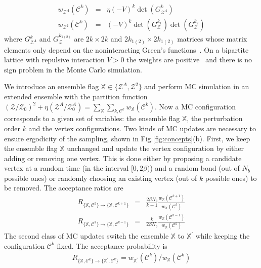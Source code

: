 \documentclass[12pt,onecolumn,english,prl,showpacs,nofootinbib]{revtex4-1}
\begin{document}
\begin{eqnarray}
w_{\mathcal{Z}^{A}}(\mathcal{C}^{k}) &=& \eta (-V)^{k} \det(G^{k}_{\mathcal{Z}^{A}})  \label{eq:ZAweight} \\
w_{\mathcal{Z}^{2}}(\mathcal{C}^{k}) &= & (-V)^{k} \det(G^{k_{1}}_{\mathcal{Z}}) \det(G^{k_{2}}_{\mathcal{Z}})
\label{eq:Z2weight}
\end{eqnarray}
where $G^{k}_{\mathcal{Z}^{A}}$ and $G_{\mathcal{Z}}^{k_{1(2)}}$ are $2k\times 2k$ and $2k_{1(2)}\times 2k_{1(2)}$ matrices whose matrix elements only depend on the noninteracting Green's functions~\cite{SM}. On a bipartite lattice with repulsive interaction $V>0$ the weights are positive~\cite{Huffman:2014fj, CTQMCpaper} and there is no sign problem in the Monte Carlo simulation. 

We introduce an ensemble flag $\mathbb{X}\in \{\mathcal{Z}^{A}, \mathcal{Z}^{2}\}$ and perform MC simulation in an extended ensemble \cite{Burovski:2006hv, Humeniuk:2012cq} with the partition function $(\mathcal{Z}/\mathcal{Z}_{0})^{2} + \eta (\mathcal{Z}^{A}/\mathcal{Z}_{0}^{A}) = \sum_{\mathbb{X}}\sum_{k, \mathcal{C}^{k}}w_\mathbb{X} (\mathcal{C}^{k})$. Now a MC configuration corresponds to a given set of variables: the ensemble flag $\mathbb{X}$, the perturbation order $k$ and the vertex configurations. Two kinds of MC updates are necessary to ensure ergodicity of the sampling, shown in Fig.{\ref{fig:concepts}}(b). First, we keep the ensemble flag $\mathbb{X}$ unchanged and update the vertex configuration by either adding or removing one vertex. This is done either by proposing a candidate vertex at a random time (in the interval $[0, 2\beta)$) and a random bond (out of $N_{b}$ possible ones) or randomly choosing an existing vertex (out of $k$ possible ones) to be removed. The acceptance ratios are
\begin{eqnarray}
R_{\{\mathbb{X}, \mathcal{C}^{k}\}\rightarrow \{\mathbb{X}, \mathcal{C}^{k+1}\}} & =&  \frac{2\beta  N_{b}}{k+1} \frac{w_\mathbb{X}(\mathcal{C}^{k+1})}{w_\mathbb{X}(\mathcal{C}^{k})} \label{eq:add} \\
R_{\{\mathbb{X}, \mathcal{C}^{k}\}\rightarrow \{\mathbb{X}, \mathcal{C}^{k-1}\}} & =&  \frac{k}{2\beta  N_{b}} \frac{w_\mathbb{X}(\mathcal{C}^{k-1})}{w_\mathbb{X}(\mathcal{C}^{k})} \label{eq:remove}
\end{eqnarray}
The second class of MC updates switch the ensemble $\mathbb{X}$ to $\mathbb{X}^{\prime}$ while keeping the configuration $\mathcal{C}^{k}$ fixed. The acceptance probability is
\begin{eqnarray}
R_{\{\mathbb{X}, \mathcal{C}^{k}\} \rightarrow \{\mathbb{X}^{\prime}, \mathcal{C}^{k}\} } = {w_{\mathbb{X}^{\prime}}(\mathcal{C}^{k})}/{w_{\mathbb{X}}(\mathcal{C}^{k})}
\label{eq:switch}
\end{eqnarray} 
\end{document}
